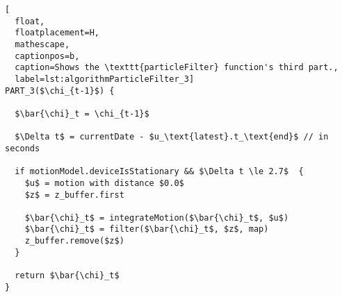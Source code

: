 \begin{lstlisting}[
  float,
  floatplacement=H,
  mathescape,
  captionpos=b,
  caption=Shows the \texttt{particleFilter} function's third part.,
  label=lst:algorithmParticleFilter_3]
PART_3($\chi_{t-1}$) {

  $\bar{\chi}_t = \chi_{t-1}$

  $\Delta t$ = currentDate - $u_\text{latest}.t_\text{end}$ // in seconds

  if motionModel.deviceIsStationary && $\Delta t \le 2.7$  {
    $u$ = motion with distance $0.0$
    $z$ = z_buffer.first

    $\bar{\chi}_t$ = integrateMotion($\bar{\chi}_t$, $u$)
    $\bar{\chi}_t$ = filter($\bar{\chi}_t$, $z$, map)
    z_buffer.remove($z$)
  }

  return $\bar{\chi}_t$
}
\end{lstlisting}
